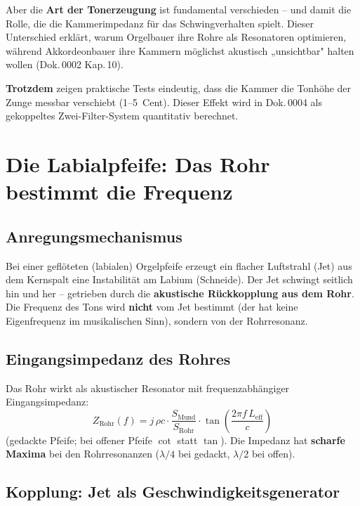 \documentclass[11pt,a4paper]{article}
\begin{document}
Aber die \textbf{Art der Tonerzeugung} ist fundamental verschieden -- und damit die Rolle, die die Kammerimpedanz für das Schwingverhalten spielt. Dieser Unterschied erklärt, warum Orgelbauer ihre Rohre als Resonatoren optimieren, während Akkordeonbauer ihre Kammern möglichst akustisch „unsichtbar" halten wollen (Dok.\,0002 Kap.\,10).

\textbf{Trotzdem} zeigen praktische Tests eindeutig, dass die Kammer die Tonhöhe der Zunge messbar verschiebt (1--5~Cent). Dieser Effekt wird in Dok.\,0004 als gekoppeltes Zwei-Filter-System quantitativ berechnet.

\section{Die Labialpfeife: Das Rohr bestimmt die Frequenz}

\subsection{Anregungsmechanismus}

Bei einer geflöteten (labialen) Orgelpfeife erzeugt ein flacher Luftstrahl (Jet) aus dem Kernspalt eine Instabilität am Labium (Schneide). Der Jet schwingt seitlich hin und her -- getrieben durch die \textbf{akustische Rückkopplung aus dem Rohr}. Die Frequenz des Tons wird \textbf{nicht} vom Jet bestimmt (der hat keine Eigenfrequenz im musikalischen Sinn), sondern von der Rohrresonanz.

\subsection{Eingangsimpedanz des Rohres}

Das Rohr wirkt als akustischer Resonator mit frequenzabhängiger Eingangsimpedanz:
\begin{equation}
Z_\text{Rohr}(f) = j\,\rho c \cdot \frac{S_\text{Mund}}{S_\text{Rohr}} \cdot \tan\!\left(\frac{2\pi f\, L_\text{eff}}{c}\right)
\end{equation}
(gedackte Pfeife; bei offener Pfeife $\cot$ statt $\tan$). Die Impedanz hat \textbf{scharfe Maxima} bei den Rohrresonanzen ($\lambda/4$ bei gedackt, $\lambda/2$ bei offen).

\subsection{Kopplung: Jet als Geschwindigkeitsgenerator}
\end{document}
